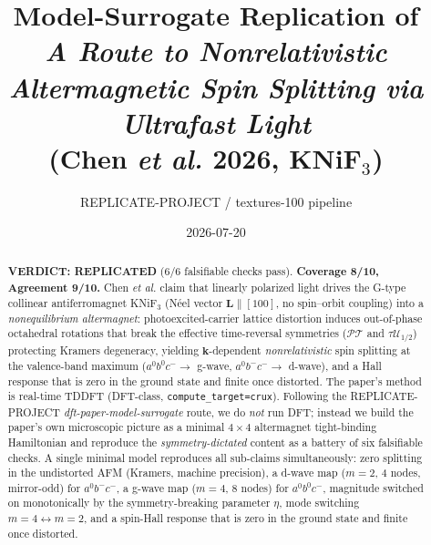 \documentclass[11pt]{article}
\title{Model-Surrogate Replication of \\
\textit{A Route to Nonrelativistic Altermagnetic Spin Splitting via Ultrafast Light}\\
(Chen \textit{et al.} 2026, KNiF$_3$)}
\author{REPLICATE-PROJECT / textures-100 pipeline}
\date{2026-07-20}
\begin{document}
\maketitle

\begin{abstract}
\textbf{VERDICT: REPLICATED} (6/6 falsifiable checks pass). \textbf{Coverage 8/10, Agreement 9/10.}
Chen \textit{et al.} claim that linearly polarized light drives the G-type collinear
antiferromagnet KNiF$_3$ (N\'eel vector $\mathbf{L}\parallel[100]$, no spin--orbit coupling)
into a \emph{nonequilibrium altermagnet}: photoexcited-carrier lattice distortion induces
out-of-phase octahedral rotations that break the effective time-reversal symmetries
($\mathcal{PT}$ and $\tau\mathcal{U}_{1/2}$) protecting Kramers degeneracy, yielding
$\mathbf{k}$-dependent \emph{nonrelativistic} spin splitting at the valence-band maximum
($a^0b^0c^-\!\to$ g-wave, $a^0b^-c^-\!\to$ d-wave), and a Hall response that is zero in the
ground state and finite once distorted. The paper's method is real-time TDDFT
(DFT-class, \texttt{compute\_target=crux}). Following the REPLICATE-PROJECT
\textit{dft-paper-model-surrogate} route, we do \emph{not} run DFT; instead we build the
paper's own microscopic picture as a minimal $4\times4$ altermagnet tight-binding
Hamiltonian and reproduce the \emph{symmetry-dictated} content as a battery of six
falsifiable checks. A single minimal model reproduces all sub-claims simultaneously:
zero splitting in the undistorted AFM (Kramers, machine precision), a d-wave map
($m{=}2$, 4 nodes, mirror-odd) for $a^0b^-c^-$, a g-wave map ($m{=}4$, 8 nodes) for
$a^0b^0c^-$, magnitude switched on monotonically by the symmetry-breaking parameter
$\eta$, mode switching $m{=}4\leftrightarrow m{=}2$, and a spin-Hall response that is zero
in the ground state and finite once distorted.
\end{abstract}
\end{document}
